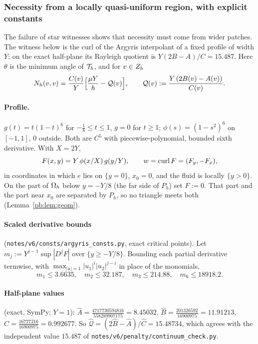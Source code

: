 \subsubsection{Necessity from a locally quasi-uniform region, with explicit constants}

The failure of star witnesses shows that necessity must come from wider patches. The witness below is the curl of the Argyris interpolant of a fixed profile of width $Y$; on the exact half-plane its Rayleigh quotient is $Y(2B-A)/C=15.487$. Here $\theta$ is the minimum angle of $\mathcal T_h$, and for $v\in Z_h$
\[
N_h(v,v)=\frac{C(v)}{Y}\Bigl[\frac{\mu Y}{h}-\mathcal Q(v)\Bigr],\qquad \mathcal Q(v):=\frac{Y\,(2B(v)-A(v))}{C(v)} .
\]

\paragraph{Profile.} $g(t)=t(1-t)^6$ for $-\tfrac18\le t\le1$, $g=0$ for $t\ge1$; $\phi(s)=(1-s^2)^6$ on $[-1,1]$, $0$ outside.
Both are $C^5$ with piecewise-polynomial, bounded sixth derivative. With $X=2Y$,
\[F(x,y)=Y\,\phi(x/X)\,g(y/Y),\qquad w=\operatorname{curl} F=(F_y,-F_x),\]
in coordinates in which $e$ lies on $\{y=0\}$, $x_0=0$, and the fluid is locally $\{y>0\}$. On the part of $\Omega_h$ below
$y=-Y/8$ (the far side of $P_h$) set $F:=0$. That part and the part near $x_0$ are separated by $P_h$, so no triangle meets
both (Lemma~\ref{pb:lem:geom}).

\paragraph{Scaled derivative bounds} (\texttt{notes/v6/consts/argyris\_consts.py}, exact critical points). Let
$m_j:=Y^{j-1}\sup|D^jF|$ over $\{y\ge-Y/8\}$. Bounding each partial derivative termwise, with
$\max_{|u|=1}|u_1|^i|u_2|^{j-i}$ in place of the monomials,
\[m_1\le3.6635,\quad m_2\le32.187,\quad m_3\le214.88,\quad m_6\le18918.2 .\]
\paragraph{Half-plane values} (exact, SymPy; $Y=1$):
$\hat A=\tfrac{4717730594816}{558289907175}=8.45032$, $\hat B=\tfrac{201326592}{16900975}=11.91213$,
$\hat C=\tfrac{16777216}{16900975}=0.992677$. So $\hat{\mathcal Q}=(2\hat B-\hat A)/\hat C=15.48734$, which agrees with the independent
value $15.487$ of \texttt{notes/v6/penalty/continuum\_check.py}.


